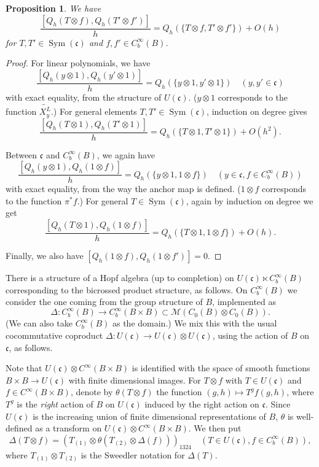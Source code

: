 \documentclass[a4paper,11pt]{amsart}
\newcommand{\s}[1]{\mathcal{#1}}
\newcommand{\fr}[1]{\mathfrak{#1}}
\DeclareMathOperator{\Sym}{Sym}
\newtheorem{prop}[thm]{Proposition}
\theoremstyle{definition}
\theoremstyle{remark}
\begin{document}
\begin{prop}
We have
\[
\frac{[Q_h(T \otimes f), Q_h(T' \otimes f')]}{h} = Q_h(\{T \otimes f, T' \otimes f'\}) + O(h)
\]
for $T, T' \in \Sym(\fr{c})$ and $f, f' \in C^\infty_b(B)$.
\end{prop}

\begin{proof}
For linear polynomials, we have
\[
\frac{[Q_h(y \otimes 1), Q_h(y' \otimes 1)]}{h} = Q_h(\{y \otimes 1, y' \otimes 1\})\quad (y, y' \in \fr{c})
\]
with exact equality, from the structure of $U(\fr{c})$.
($y \otimes 1$ corresponds to the function $\widetilde{X^L_y}$.)
For general elements $T, T' \in \Sym(\fr{c})$, induction on degree gives
\[
\frac{[Q_h(T \otimes 1), Q_h(T' \otimes 1)]}{h} = Q_h(\{T \otimes 1, T' \otimes 1\}) + O(h^2).
\]

Between $\fr{c}$ and $C^\infty_b(B)$, we again have
\[
\frac{[Q_h(y \otimes 1), Q_h(1 \otimes f)]}{h} = Q_h(\{y \otimes 1, 1 \otimes f\})\quad(y \in \fr{c}, f \in C^\infty_b(B))
\]
with exact equality, from the way the anchor map is defined.
($1 \otimes f$ corresponds to the function $\pi^* f$.)
For general $T \in \Sym(\fr{c})$, again by induction on degree we get
\[
\frac{[Q_h(T \otimes 1), Q_h(1 \otimes f)]}{h} = Q_h(\{T \otimes 1, 1 \otimes f\}) + O(h).
\]

Finally, we also have $[Q_h(1 \otimes f), Q_h(1 \otimes f')] = 0$.
\end{proof}

There is a structure of a Hopf algebra (up to completion) on $U(\fr{c}) \ltimes C^\infty_b(B)$ corresponding to the bicrossed product structure, as follows.
On $C^\infty_b(B)$ we consider the one coming from the group structure of $B$, implemented as
\[
\Delta\colon C^\infty_b(B) \to C^\infty_b(B \times B) \subset \s{M}(C_0(B) \otimes C_0(B)).
\]
(We can also take $C^\infty_b(B)$ as the domain.)
We mix this with the usual cocommutative coproduct $\Delta \colon U(\fr{c}) \to U(\fr{c}) \otimes U(\fr{c})$, using the action of $B$ on $\fr{c}$, as follows.

Note that $U(\fr{c}) \otimes C^\infty(B \times B)$ is identified with the space of smooth functions $B \times B \to U(\fr{c})$ with finite dimensional images.
For $T \otimes f$ with $T \in U(\fr{c})$ and $f \in C^\infty(B \times B)$, denote by $\theta(T \otimes f)$ the function $(g, h) \mapsto T^{g} f(g, h)$, where $T^g$ is the \emph{right} action of $B$ on $U(\fr{c})$ induced by the right action on $\fr{c}$.
Since $U(\fr{c})$ is the increasing union of finite dimensional representations of $B$, $\theta$ is well-defined as a transform on $U(\fr{c}) \otimes C^\infty(B \times B)$.
We then put
\[
\Delta(T \otimes f) = (T_{(1)} \otimes \theta(T_{(2)} \otimes \Delta(f)))_{1324} \quad (T \in U(\fr{c}), f \in C^\infty_b(B)),
\]
where $T_{(1)} \otimes T_{(2)}$ is the Sweedler notation for $\Delta(T)$.
\end{document}
